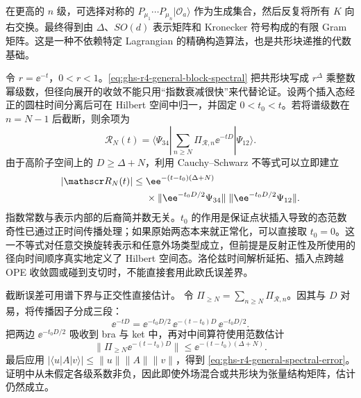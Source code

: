 在更高的 $n$ 级，可选择对称的 $P_{\mu_1}\cdots P_{\mu_n}|\mathcal O_a\rangle$ 作为生成集合，然后反复将所有 $K$ 向右交换。最终得到由 $\Delta$、$SO(d)$ 表示矩阵和 Kronecker 符号构成的有限 Gram 矩阵。这是一种不依赖特定 Lagrangian 的精确构造算法，也是共形块递推的代数基础。


令 $r=\ee^{-t}$，$0<r<1$。\cref{eq:ghs-r4-general-block-spectral} 把共形块写成 $r^{\Delta}$ 乘整数幂级数，但径向展开的收敛不能只用“指数衰减很快”来代替论证。设两个插入态经正的圆柱时间分离后可在 Hilbert 空间中归一，并固定 $0<t_0<t$。若将谱级数在 $n=N-1$ 后截断，则余项为
\begin{equation*}
 \mathscr R_N(t)=\langle\Psi_{34}|\sum_{n\ge N}
 \Pi_{\mathcal R,n}\ee^{-tD}|\Psi_{12}\rangle.
\end{equation*}
由于高阶子空间上的 $D\ge\Delta+N$，利用 Cauchy--Schwarz 不等式可以立即建立
\begin{align}\label{eq:ghs-r4-general-spectral-error}
 |\mathscr R_N(t)|\le{}&\ee^{-(t-t_0)(\Delta+N)}\\
 &\times\|\ee^{-t_0D/2}\Psi_{34}\|
 \;\|\ee^{-t_0D/2}\Psi_{12}\|.
 \notag
\end{align}
指数常数与表示内部的后裔简并数无关。$t_0$ 的作用是保证点状插入导致的态范数奇性已通过正时间传播处理；如果原始两态本来就正常化，可以直接取 $t_0=0$。这一不等式对任意交换旋转表示和任意外场类型成立，但前提是反射正性及所使用的径向时间顺序真实地定义了 Hilbert 空间态。洛伦兹时间解析延拓、插入点跨越 OPE 收敛圆或碰到支切时，不能直接套用此欧氏误差界。


截断误差可用谱下界与正交性直接估计。
令 $\Pi_{\ge N}=\sum_{n\ge N}\Pi_{\mathcal R,n}$。因其与 $D$ 对易，将传播因子分成三段：
\begin{equation*}
 \ee^{-tD}=\ee^{-t_0D/2}\,\ee^{-(t-t_0)D}\,\ee^{-t_0D/2}.
\end{equation*}
把两边 $\ee^{-t_0D/2}$ 吸收到 bra 与 ket 中，再对中间算符使用范数估计
\begin{equation*}
 \|\Pi_{\ge N}\ee^{-(t-t_0)D}\|
 \le\ee^{-(t-t_0)(\Delta+N)}.
\end{equation*}
最后应用 $|\langle u|A|v\rangle|\le\|u\|\|A\|\|v\|$，得到 \cref{eq:ghs-r4-general-spectral-error}。证明中从未假定各级系数非负，因此即使外场混合或共形块为张量结构矩阵，估计仍然成立。


